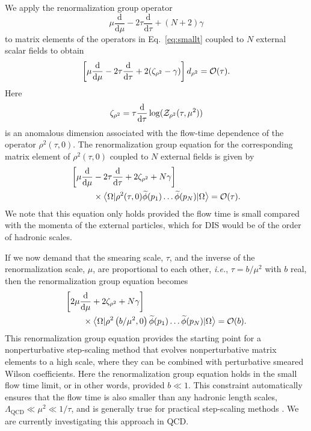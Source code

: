 We apply the renormalization group operator
\begin{equation}
\mu\frac{\mathrm{d}}{\mathrm{d} \mu} 
-2\tau\frac{\mathrm{d}}{\mathrm{d} \tau} + \left(N+2\right)\gamma
\end{equation}
to matrix elements of the operators in Eq.~\eqref{eq:smallt} coupled to 
$N$ 
external scalar fields to obtain
\begin{equation}\label{eq:srge}
\left[\mu\frac{\mathrm{d}}{\mathrm{d} 
\mu} -2\tau\frac{\mathrm{d}}{\mathrm{d} 
\tau} +2(\zeta_{\rho^2}-\gamma)\right]d_{\rho^2} = {\cal O}(\tau).
\end{equation}
Here
\begin{equation}
\zeta_{\rho^2} = \tau\frac{\mathrm{d}}{\mathrm{d}\tau}\log({\cal 
Z}_{\rho^2}(\tau,\mu^2))\label{eq:zetadef}
\end{equation}
is an anomalous dimension associated with the flow-time dependence of the 
operator $\rho^2(\tau,0)$. The renormalization group equation for the 
corresponding
matrix element of $\rho^2(\tau,0)$ coupled to $N$ external fields is 
given by
\begin{align}\label{eq:rhotau}
\bigg[\mu\frac{\mathrm{d}}{\mathrm{d} 
\mu}{} & -2\tau\frac{\mathrm{d}}{\mathrm{d} 
\tau} +2\zeta_{\rho^2}+N\gamma\bigg] \nonumber\\
{} & \times\big\langle \Omega 
|\rho^2(\tau,0)\widetilde{\phi}(p_1)\ldots\widetilde{\phi}(p_N) 
| \Omega \big\rangle = {\cal O}(\tau).
\end{align}
We note that this equation only holds provided the flow time is small compared 
with the momenta of the external particles, which for DIS would be of the order 
of hadronic scales.

If we now demand that the smearing scale, 
$\tau$, and the inverse of the renormalization scale, $\mu$, are 
proportional to each other, \emph{i.e.}, $\tau = b/\mu^2$ with $b$ real, then 
the 
renormalization group 
equation 
becomes
\begin{align}\label{eq:rhotau_mutau}
{} &
\bigg[2\mu\frac{\mathrm{d}}{\mathrm{d} 
\mu} +2\zeta_{\rho^2}+N\gamma\bigg] \nonumber\\
{} &\qquad \times\big\langle \Omega 
|\rho^2\left( b/\mu^2,0\right)\widetilde{\phi}(p_1)\ldots\widetilde{\phi
} (p_N) 
| \Omega \big\rangle = {\cal O}(b).
\end{align}
This renormalization group equation provides the starting point for a 
nonperturbative 
step-scaling method \cite{Monahan:2013lwa,Luscher:1991oxn} that evolves 
nonperturbative matrix elements to a high scale, where they can be combined 
with 
perturbative smeared Wilson coefficients. Here the renormalization group 
equation holds in 
the small flow time limit, or in other words, provided $b\ll 1$. This 
constraint automatically ensures that the flow time is also smaller than any 
hadronic length scales, $\Lambda_{\mathrm{QCD}} \ll \mu^2 \ll 1/\tau$, and is 
generally true for practical step-scaling methods 
\cite{Monahan:2013lwa,Luscher:1991oxn}. We are currently 
investigating this approach in QCD.

